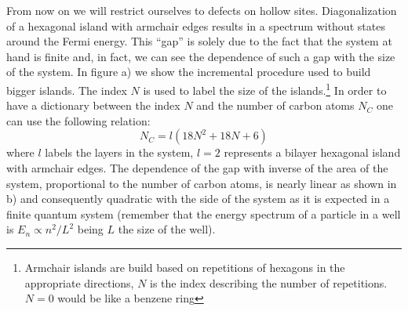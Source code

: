 From now on we will restrict ourselves to defects on hollow sites.
Diagonalization of a hexagonal island with armchair edges results in a spectrum without states around the Fermi energy. This ``gap'' is solely due to the fact that the system at hand is finite and, in fact, we can see the dependence of such a gap with the size of the system. In figure a) we show the incremental procedure used to build bigger islands. The index $N$ is used to label the size of the islands.\footnote{Armchair islands are build based on repetitions of hexagons in the appropriate directions, $N$ is the index describing the number of repetitions. $N=0$ would be like a benzene ring} In order to have a dictionary between the index $N$ and the number of carbon atoms $N_C$ one can use the following relation:
\begin{equation}
   N_C = l\left(18N^2+18N+6\right)
\label{Nc}
\end{equation}
where $l$ labels the layers in the system, $l=2$ represents a bilayer hexagonal island with armchair edges.
The dependence of the gap with inverse of the area of the system, proportional to the number of carbon atoms, is nearly linear as shown in b) and consequently quadratic with the side of the system as it is expected in a finite quantum system (remember that the energy spectrum of a particle in a well is $E_n\propto n^2/L^2$ being $L$ the size of the well).
